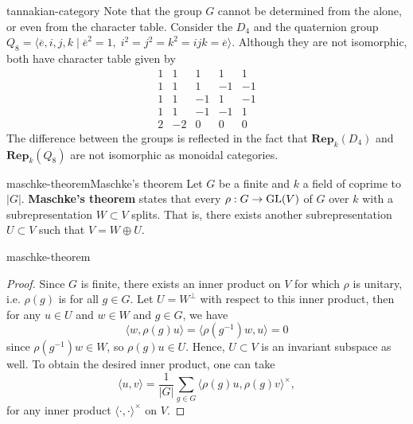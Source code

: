 \begin{example}{tannakian-category}
    Note that the group $G$ cannot be determined from the  alone, or even from the character table. Consider the  $D_4$ and the quaternion group $Q_8 = \langle \overline{e}, i, j, k \mid \overline{e}^2 = 1, \; i^2 = j^2 = k^2 = ijk = \overline{e} \rangle$. Although they are not isomorphic, both have character table given by
    \[ \begin{array}{c|c|c|c|c}
        1 & 1 & 1 & 1 & 1 \\ \hline
        1 & 1 & 1 & -1 & -1 \\ \hline
        1 & 1 & -1 & 1 & -1 \\ \hline
        1 & 1 & -1 & -1 & 1 \\ \hline
        2 & -2 & 0 & 0 & 0
    \end{array} \]
    The difference between the groups is reflected in the fact that $\textbf{Rep}_k(D_4)$ and $\textbf{Rep}_k(Q_8)$ are not isomorphic as monoidal categories.
\end{example}

\begin{topic}{maschke-theorem}{Maschke's theorem}
    Let $G$ be a finite  and $k$ a field of  coprime to $|G|$. \textbf{Maschke's theorem} states that every  $\rho : G \to \textup{GL}(V)$ of $G$ over $k$ with a subrepresentation $W \subset V$ splits. That is, there exists another subrepresentation $U \subset V$ such that $V = W \oplus U$.
\end{topic}

\begin{example}{maschke-theorem}
    \begin{proof}
        Since $G$ is finite, there exists an inner product on $V$ for which $\rho$ is unitary, i.e. $\rho(g)$ is  for all $g \in G$. Let $U = W^\perp$ with respect to this inner product, then for any $u \in U$ and $w \in W$ and $g \in G$, we have
        \[ \langle w, \rho(g) u \rangle = \langle \rho(g^{-1}) w, u \rangle = 0 \]
        since $\rho(g^{-1}) w \in W$, so $\rho(g) u \in U$. Hence, $U \subset V$ is an invariant subspace as well. To obtain the desired inner product, one can take
        \[ \langle u, v \rangle = \frac{1}{|G|} \sum_{g \in G} \langle \rho(g) u, \rho(g) v \rangle^\times , \]
        for any inner product $\langle \cdot, \cdot \rangle^\times$ on $V$.
    \end{proof}
\end{example}

